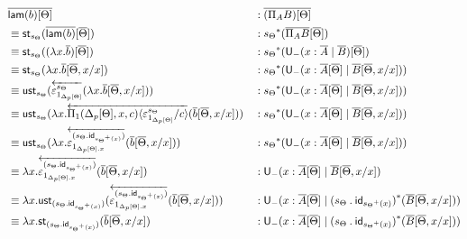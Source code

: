 \documentclass[10pt]{article}
\theoremstyle{definition}
\newcommand{\rewrite}[2]{\overleftarrow{#1}(#2)}
\newcommand\U[3]{\ensuremath{\mathsf{U}_{#1}(#2 \mid #3)}}
\newcommand\UI[2]{\ensuremath{\lambda #1.#2}}
\newcommand\St[2]{\ensuremath{{#1}^*(#2)}}
\newcommand\StI[2]{\ensuremath{\mathsf{st}_{#1}(#2)}}
\newcommand\UStI[2]{\ensuremath{\mathsf{ust}_{#1}(#2)}}
\newcommand\TrPlus[2]{\ensuremath{{#1}^+(#2)}}
\newcommand{\id}{\mathsf{id}}
\newcommand\ap[2]{\ensuremath{#1 \langle #2 \rangle }}
\newcommand\bdot[0]{\mathbin{.}}
\begin{document}
\begin{enumerate}[style = multiline, labelwidth = 80pt]
\begin{align*}
&\upstairs{\mathsf{lam}(b)[\Theta]} && : \upstairs{(\Pi_A B)[\Theta]} \\
&\equiv \StI{s_\Theta}{\upstairs{\mathsf{lam}(b)}[\upstairs{\Theta}]} && : \St{s_{\Theta}}{\upstairs{\Pi_A B}[\upstairs{\Theta}]} \\
&\equiv \StI{s_\Theta}{(\UI{x}{\upstairs{b}})[\upstairs{\Theta}]} && :  \St{s_{\Theta}}{\U{-}{x : \upstairs{A}}{\upstairs{B}}[\upstairs{\Theta}]} \\
&\equiv \StI{s_\Theta}{\UI{x}{\upstairs{b}[\upstairs{\Theta}, x / x]}} && :  \St{s_{\Theta}}{\U{-}{x : \upstairs{A}[\upstairs{\Theta}]}{\upstairs{B}[\upstairs{\Theta}, x / x]}} \\
&\equiv \UStI{s_\Theta}{\rewrite{\varepsilon^{s_\Theta}_{1_{\asdep{\Delta}[\Theta]}}}{\UI{x}{\upstairs{b}[\upstairs{\Theta}, x/x]}}} && : \St{s_{\Theta}}{\U{-}{x : \upstairs{A}[\upstairs{\Theta}]}{\upstairs{B}[\upstairs{\Theta}, x / x]}} \\
&\equiv \UStI{s_\Theta}{\UI{x}{\rewrite{\ap{\Pi_1(\asdep{\Delta}[\Theta],x,c)}{\varepsilon^{s_\Theta}_{1_{\asdep{\Delta}[\Theta]}}/c}}{\upstairs{b}[\upstairs{\Theta}, x/x]}}} && : \St{s_{\Theta}}{\U{-}{x : \upstairs{A}[\upstairs{\Theta}]}{\upstairs{B}[\upstairs{\Theta}, x / x]}} \\
&\equiv \UStI{s_\Theta}{\UI{x}{\rewrite{\varepsilon^{(s_{\Theta} \bdot \id_{\TrPlus{s_\Theta}{x}})}_{1_{\asdep{\Delta}[\Theta].x}}}{\upstairs{b}[\upstairs{\Theta}, x/x]}}} && :   \St{s_{\Theta}}{\U{-}{x : \upstairs{A}[\upstairs{\Theta}]}{\upstairs{B}[\upstairs{\Theta}, x / x]}} \\
&\equiv \UI{x}{\rewrite{\varepsilon^{(s_{\Theta} \bdot \id_{\TrPlus{s_\Theta}{x}})}_{1_{\asdep{\Delta}[\Theta].x}}}{\upstairs{b}[\upstairs{\Theta}, x/x]}} && :  \U{-}{x : \upstairs{A}[\upstairs{\Theta}]}{\upstairs{B}[\upstairs{\Theta}, x / x]} \\
&\equiv \UI{x}{\UStI{(s_{\Theta} \bdot \id_{\TrPlus{s_\Theta}{x}})}{\rewrite{\varepsilon^{(s_{\Theta} \bdot \id_{\TrPlus{s_\Theta}{x}})}_{1_{\asdep{\Delta}[\Theta].x}}}{\upstairs{b}[\upstairs{\Theta}, x/x]}}} && : \U{-}{x : \upstairs{A}[\upstairs{\Theta}]}{\St{(s_{\Theta} \bdot \id_{\TrPlus{s_\Theta}{x}})}{\upstairs{B}[\upstairs{\Theta}, x/x]}} \\
&\equiv \UI{x}{\StI{(s_{\Theta} \bdot \id_{\TrPlus{s_\Theta}{x}})}{\upstairs{b}[\upstairs{\Theta}, x/x]}} && : \U{-}{x : \upstairs{A}[\upstairs{\Theta}]}{\St{(s_{\Theta} \bdot \id_{\TrPlus{s_\Theta}{x}})}{\upstairs{B}[\upstairs{\Theta}, x/x]}} \\

\end{align*}
\end{enumerate}
\end{document}
